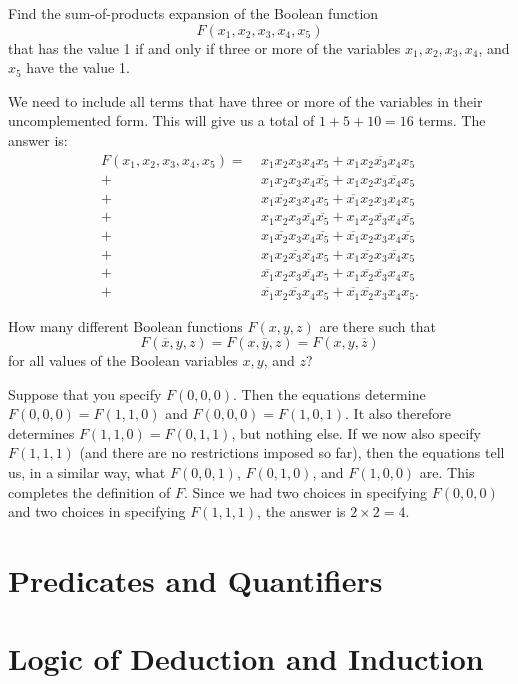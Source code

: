 \begin{exercise}
	Find the sum-of-products expansion of the Boolean function \[ F(x_1, x_2, x_3, x_4, x_5) \] that has the value 1 if and only if three or more of the variables \( x_1, x_2, x_3, x_4 \), and \( x_5 \) have the value 1.
\end{exercise}
\begin{solution}
	We need to include all terms that have three or more of the variables in their uncomplemented form. This will give us a total of \( 1 + 5 + 10 = 16 \) terms. The answer is:
	\begin{align*}
		F(x_1, x_2, x_3, x_4, x_5) = \ & x_1 x_2 x_3 x_4 x_5+ x_1 x_2 \overline{x_3} x_4 x_5\\
		+ \ & x_1 x_2 x_3 x_4 \overline{x_5} + x_1 x_2 x_3 \overline{x_4} x_5  \\
		+ \ & x_1 \overline{x_2} x_3 x_4 x_5 + \overline{x_1} x_2 x_3 x_4 x_5 \\
		+ \ & x_1 x_2 x_3 \overline{x_4} \overline{x_5} + x_1 x_2 \overline{x_3} x_4 \overline{x_5} \\
		+ \ & x_1 \overline{x_2} x_3 x_4 \overline{x_5} + \overline{x_1} x_2 x_3 x_4 \overline{x_5} \\
		+ \ & x_1 x_2 \overline{x_3} \overline{x_4} x_5 + x_1 \overline{x_2} x_3 \overline{x_4} x_5 \\
		+ \ & \overline{x_1} x_2 x_3 \overline{x_4} x_5 + x_1 \overline{x_2} \overline{x_3} x_4 x_5 \\
		+ \ & \overline{x_1} x_2 \overline{x_3} x_4 x_5 + \overline{x_1} \overline{x_2} x_3 x_4 x_5.
	\end{align*}
\end{solution}
\begin{exercise}
	How many different Boolean functions \( F(x, y, z) \) are there such that 
	\[ F(\overline{x}, y, z) = F(x, \overline{y}, z) = F(x, y, \overline{z}) \]
	for all values of the Boolean variables \( x, y \), and \( z \)?
\end{exercise}
\begin{solution}
	Suppose that you specify \( F(0, 0, 0) \). Then the equations determine \( F(0, 0, 0) = F(1, 1, 0) \) and \( F(0, 0, 0) = F(1, 0, 1) \). It also therefore determines \( F(1, 1, 0) = F(0, 1, 1) \), but nothing else. If we now also specify \( F(1, 1, 1) \) (and there are no restrictions imposed so far), then the equations tell us, in a similar way, what \( F(0, 0, 1) \), \( F(0, 1, 0) \), and \( F(1, 0, 0) \) are. This completes the definition of \( F \). Since we had two choices in specifying \( F(0, 0, 0) \) and two choices in specifying \( F(1, 1, 1) \), the answer is \( 2 \times 2 = 4 \).
	
\end{solution}
    \section{Predicates and Quantifiers}


    \section{Logic of Deduction and Induction}